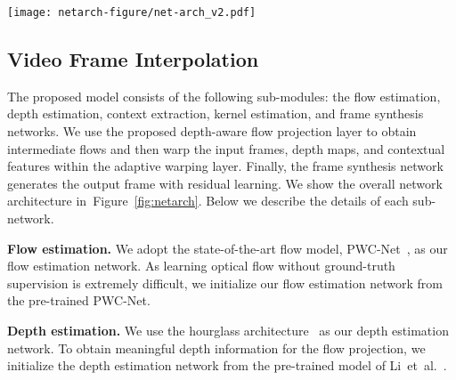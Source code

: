 \documentclass[10pt,twocolumn,letterpaper]{article}
\newcommand{\Paragraph}[1]{{\vspace{-2mm}\flushleft\textbf{#1}}} \newcommand{\ul}[1]{\underline{\smash{#1}}}
\def\etal{et~al.\xspace}
\newcommand{\figref}[1]{Figure~\ref{fig:#1}}
\begin{document}
	\begin{figure*}
	\footnotesize
	\centering
	\texttt{[image: netarch-figure/net-arch\_v2.pdf]}\vspace{-5pt}
	\caption{
		\textbf{Architecture of the proposed depth-aware video frame interpolation model.}
Given two input frames, we first estimate the optical flows and depth maps and use the proposed depth-aware flow projection layer to generate intermediate flows.
We then adopt the adaptive warping layer to warp the input frames, depth maps, and contextual features based on the flows and spatially varying interpolation kernels.
Finally, we apply a frame synthesis network to generate the output frame.
	}
	\vspace{-10pt}
	\label{fig:netarch}
\end{figure*}
 	
	\subsection{Video Frame Interpolation}
The proposed model consists of the following sub-modules: the flow estimation, depth estimation, context extraction, kernel estimation, and frame synthesis networks.
We use the proposed depth-aware flow projection layer to obtain intermediate flows and then warp the input frames, depth maps, and contextual features within the adaptive warping layer.
Finally, the frame synthesis network generates the output frame with residual learning.
We show the overall network architecture in~\figref{netarch}.
Below we describe the details of each sub-network.
	
	
	
	\Paragraph{Flow estimation.}
We adopt the state-of-the-art flow model, PWC-Net~\cite{sun2018pwc}, as our flow estimation network.
As learning optical flow without ground-truth supervision is extremely difficult, we initialize our flow estimation network from the pre-trained PWC-Net.


	
	\Paragraph{Depth estimation.}
We use the hourglass architecture~\cite{chen2016single} as our depth estimation network.
To obtain meaningful depth information for the flow projection, we initialize the depth estimation network from the pre-trained model of Li~\etal~\cite{li2018megadepth}.
	
\end{document}
